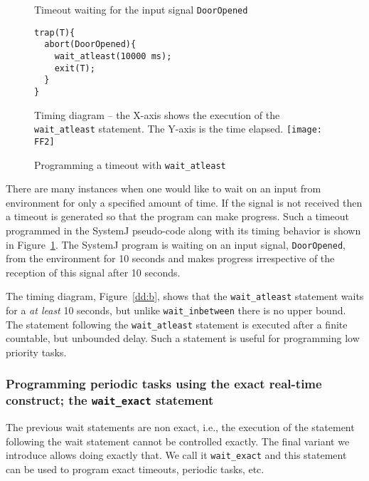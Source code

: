 \begin{figure}[b!]
	\centering
	\vspace{-10pt}
        \begin{SubFloat}{\label{dd:a}Timeout waiting for the input
            signal \texttt{DoorOpened}}
        \begin{lstlisting}[style=sysj,morekeywords={abort,await,emit,present,trap,pause,exit,wait_atleast,suspend}]
trap(T){
  abort(DoorOpened){
    wait_atleast(10000 ms);
    exit(T);  
  }
}
\end{lstlisting}
\end{SubFloat}
\begin{SubFloat}{\label{dd:b}Timing diagram -- the X-axis shows the
    execution of the \texttt{wait\_atleast} statement. The Y-axis is the
    time elapsed.}
\texttt{[image: FF2]}
\end{SubFloat}
\caption{Programming a timeout with \texttt{wait\_atleast}}
\label{dd}
\end{figure}

There are many instances when one would like to wait on an input from
environment for only a specified amount of time. If the signal is not
received then a timeout is generated so that the program can make
progress. Such a timeout programmed in the SystemJ pseudo-code along
with its timing behavior is shown in Figure~\ref{dd}. The SystemJ
program is waiting on an input signal, \texttt{DoorOpened}, from the
environment for 10 seconds and makes progress irrespective of the
reception of this signal after 10 seconds.

The timing diagram, Figure~\ref{dd:b}, shows that the
\texttt{wait\_atleast} statement waits for a \textit{at least} 10
seconds, but unlike \texttt{wait\_inbetween} there is no upper
bound. The statement following the \texttt{wait\_atleast} statement is
executed after a finite countable, but unbounded delay. Such a statement
is useful for programming low priority tasks.


\subsubsection{Programming periodic tasks using the exact real-time
  construct; the \texttt{wait\_exact} statement}
\label{sec:progr-using-exact}

The previous wait statements are non exact, i.e., the 
execution of the statement following the wait statement cannot be
controlled exactly. The final variant we introduce allows doing exactly
that. We call it \texttt{wait\_exact} and this statement can be used to
program exact timeouts, periodic tasks, etc.

